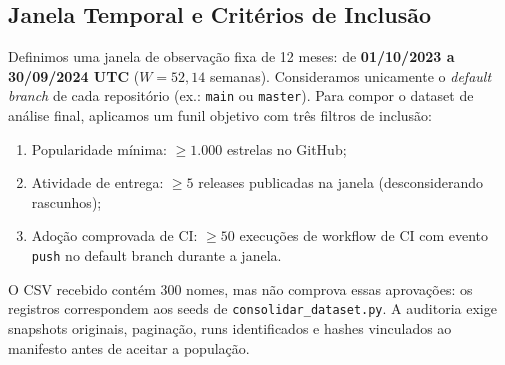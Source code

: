\documentclass[12pt]{article}
\begin{document}
\subsection{Janela Temporal e Critérios de Inclusão}
Definimos uma janela de observação fixa de 12 meses: de \textbf{01/10/2023 a 30/09/2024 UTC} ($W = 52{,}14$ semanas). Consideramos unicamente o \textit{default branch} de cada repositório (ex.: \texttt{main} ou \texttt{master}). Para compor o dataset de análise final, aplicamos um funil objetivo com três filtros de inclusão:
\begin{enumerate}
    \item Popularidade mínima: $\ge 1.000$ estrelas no GitHub;
    \item Atividade de entrega: $\ge 5$ releases publicadas na janela (desconsiderando rascunhos);
    \item Adoção comprovada de CI: $\ge 50$ execuções de workflow de CI com evento \texttt{push} no default branch durante a janela.
\end{enumerate}
O CSV recebido contém 300 nomes, mas não comprova essas aprovações: os registros correspondem aos seeds de \texttt{consolidar\_dataset.py}. A auditoria exige snapshots originais, paginação, runs identificados e hashes vinculados ao manifesto antes de aceitar a população.
\end{document}
